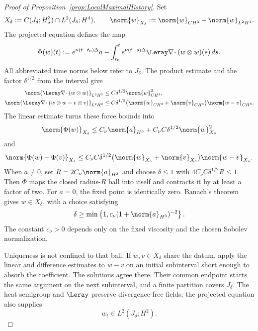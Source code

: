 \begin{proof}[Proof of Proposition~\ref{prop:LocalMaximalHistory}]
Set
\[
  X_\delta
  :=C(J_\delta;H^3_\sigma)\cap L^2(J_\delta;H^4),
  \qquad
  \norm{w}_{X_\delta}
  :=\norm{w}_{C H^3}+\norm{w}_{L^2H^4}.
\]
The projected equation defines the map
\begin{equation}
  \Phi(w)(t)
  :=e^{\nu(t-t_0)\Delta}a
  -\int_{t_0}^{t}e^{\nu(t-s)\Delta}
    \Leray\nabla\!\cdot(w\otimes w)(s)\,ds.
  \label{eq:LocalMildMap}
\end{equation}
All abbreviated time norms below refer to \(J_\delta\).  The product estimate
and the factor \(\delta^{1/2}\) from the interval give
\begin{align}
  \norm{\Leray\nabla\!\cdot(w\otimes w)}_{L^2H^2}
  &\leq C\delta^{1/2}\norm{w}_{C H^3}^2,
  \label{eq:LocalQuadraticCount}
  \\
  \norm{\Leray\nabla\!\cdot(w\otimes w-v\otimes v)}_{L^2H^2}
  &\leq C\delta^{1/2}
  \bigl(\norm{w}_{C H^3}+\norm{v}_{C H^3}\bigr)
  \norm{w-v}_{C H^3}.
  \label{eq:LocalDifferenceCount}
\end{align}
The linear estimate turns these force bounds into
\[
  \norm{\Phi(w)}_{X_\delta}
  \leq C_\nu\norm{a}_{H^3}
  +C_\nu C\delta^{1/2}\norm{w}_{X_\delta}^2
\]
and
\[
  \norm{\Phi(w)-\Phi(v)}_{X_\delta}
  \leq C_\nu C\delta^{1/2}
  \bigl(\norm{w}_{X_\delta}+\norm{v}_{X_\delta}\bigr)
  \norm{w-v}_{X_\delta}.
\]
When \(a\neq0\), set \(R=2C_\nu\norm{a}_{H^3}\) and choose
\(\delta\leq1\) with \(4C_\nu C\delta^{1/2}R\leq1\).  Then \(\Phi\) maps the
closed radius-\(R\) ball into itself and contracts it by at least a factor of
two.  For \(a=0\), the fixed point is identically zero.  Banach’s theorem gives
\(w\in X_\delta\), with a choice satisfying
\begin{equation}
  \delta
  \geq
  \min\left\{1,c_\nu(1+\norm{a}_{H^3})^{-2}\right\}.
  \label{eq:LocalLifespan}
\end{equation}
The constant \(c_\nu>0\) depends only on the fixed viscosity and the chosen
Sobolev normalization.

Uniqueness is not confined to that ball.  If \(w,v\in X_\delta\) share the
datum, apply the linear and difference estimates to \(w-v\) on an initial
subinterval short enough to absorb the coefficient.  The solutions agree
there.  Their common endpoint starts the same argument on the next subinterval,
and a finite partition covers \(J_\delta\).  The heat semigroup and \(\Leray\)
preserve divergence-free fields; the projected equation also supplies
\begin{equation}
  w_t\in L^2(J_\delta;H^2).
  \label{eq:LocalTimeRow}
\end{equation}


\end{proof}

